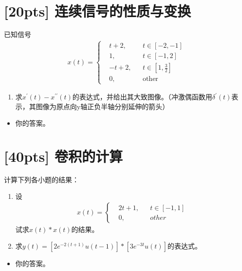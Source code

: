 \documentclass[a4paper,UTF8]{article}
\numberwithin{equation}{section}
\begin{document}
\section{[20pts] 连续信号的性质与变换}
已知信号
\begin{equation*}
    \begin{aligned}
        x(t)=\left\{
        \begin{aligned}
             & t+2,  &  & t\in[-2,-1] \\
             & 1,    &  & t\in[-1,2]  \\
             & -t+2, &  & t\in[1,\frac{3}{2}]   \\
             & 0   , &  & \text{other}
        \end{aligned}
        \right.
    \end{aligned}
\end{equation*}
\begin{enumerate}[(1)]
    \item 求$x^{\prime}(t)-x^{\prime\prime}(t)$的表达式，并给出其大致图像。（冲激偶函数用$\delta^{\prime}(t)$表示，其图像为原点向y轴正负半轴分别延伸的箭头）
\end{enumerate}

\begin{framed}
    \begin{spacing}{1.5}
        \begin{itemize}
            \item 你的答案。
        \end{itemize}
    \end{spacing}
\end{framed}


\newpage
\section{[40pts] 卷积的计算 }
计算下列各小题的结果：
\begin{enumerate}[(1)]
    \item 设
          \begin{equation*}
              \begin{aligned}
                  x(t)=\left\{
                  \begin{aligned}
                       & 2t+1, &  & t\in[-1,1] \\
                       & 0,    &  & other
                  \end{aligned}
                  \right.
              \end{aligned}
          \end{equation*}
          试求$x(t)*x(t)$的结果。
    \item 求$y(t)=[2e^{-2(t+1)}u(t-1)]*[3e^{-3t}u(t)]$的表达式。
\end{enumerate}

\begin{framed}
    \begin{spacing}{1.5}
        \begin{itemize}
            \item 你的答案。
        \end{itemize}
    \end{spacing}
\end{framed}
\newpage
\end{document}
